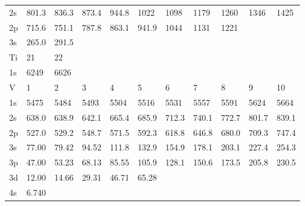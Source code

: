 \begin{table}
\begin{center}
\begin{tabular}{lllllllllll}
2s& 801.3& 836.3&
873.4& 944.8& 1022& 1098& 1179& 1260& 1346& 1425\\
2p& 715.6& 751.1& 787.8& 863.1&
941.9&  1044&  1131&  1221\\
3s& 265.0& 291.5\\
\hline
Ti& 21&  22\\
\hline
1s&  6249&  6626\\
\hline
V&  1&   2& 3&   4&   5&   6&   7&   8&   9&  10\\
\hline
1s&  5475&  5484&  5493&  5504&  5516&  5531&  5557&
5591&  5624&  5664\\
2s& 638.0& 638.9& 642.1& 665.4& 685.9& 712.3& 740.1& 772.7& 801.7&
839.1\\
2p& 527.0& 529.2& 548.7& 571.5& 592.3& 618.8& 646.8& 680.0& 709.3& 747.4\\
3s& 77.00&
79.42& 94.52& 111.8& 132.9& 154.9& 178.1& 203.1& 227.4& 254.3\\
3p& 47.00& 53.23& 68.13&
85.55& 105.9& 128.1& 150.6& 173.5& 205.8& 230.5\\
3d& 12.00& 14.66& 29.31& 46.71& 65.28\\
4s&
6.740\\
\hline
\end{tabular}
\end{center}
\end{table}


